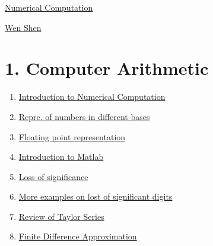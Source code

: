 \documentclass[11pt]{article}
\begin{document}
	\kaishu 
	\setcounter{section}{0}
	\begin{center}
		{\LARGE  \href{https://www.youtube.com/playlist?list=PLbxFfU5GKZz3D4NPYvvY7dvXiZ0awd4zn}{Numerical Computation}}
		
		
		{\large \href{https://sites.psu.edu/wxs27/}{Wen Shen}}
	\end{center}
\setcounter{page}{1}



\vspace{-1cm}

\section*{1. Computer Arithmetic}

\vspace{-0.5cm}

\begin{multicols}{2}
	\begin{enumerate}
		\item \href{https://mp.weixin.qq.com/s/cgsyPIr7w-fEbRACNE1ezg}{Introduction to Numerical Computation}	%
		\item \href{https://mp.weixin.qq.com/s/QCssJJjJ8xno2kND1BAYaA}{Repre. of numbers in different bases}	%
		\item \href{https://mp.weixin.qq.com/s/iWqrQSD0Gqr8DKG2GydUbQ}{Floating point representation}	%
		\item \href{https://mp.weixin.qq.com/s/9Tj0u32iptv76BmdE0pMOA}{Introduction to Matlab}	%
		\item \href{https://mp.weixin.qq.com/s/U4CjxHjiI_Xng5sTcorRVQ}{Loss of significance}	%
		\item \href{https://mp.weixin.qq.com/s/hny_RovdEhvd1qBYzPRr8g}{More examples on lost of significant digits}	%
		\item \href{https://mp.weixin.qq.com/s/VjbfnKxb1SXusT-z9vVFYw}{Review of Taylor Series}	%
		\item \href{https://mp.weixin.qq.com/s/sM24GvqIp8F-Q6NAfz0iGQ}{Finite Difference Approximation}	%
	\end{enumerate}
\end{multicols}
\end{document}
